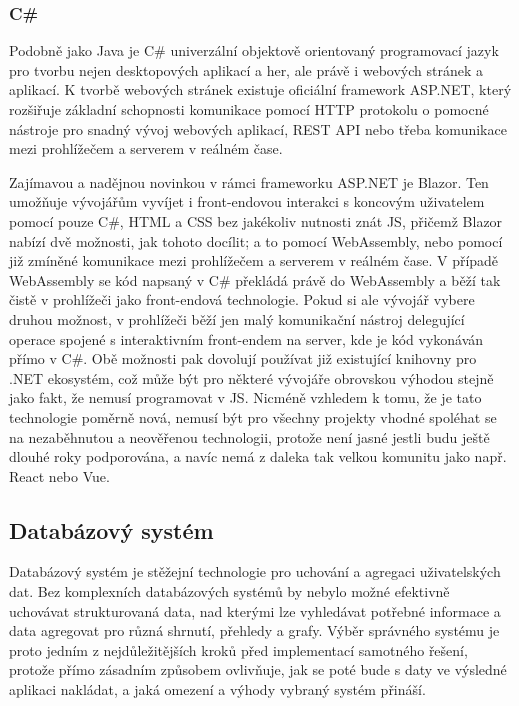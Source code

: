 		\subsubsection{C\#}

		Podobně jako Java je C\# univerzální objektově orientovaný programovací jazyk pro tvorbu nejen
		desktopových aplikací a her, ale právě i webových stránek a aplikací.
		K tvorbě webových stránek existuje oficiální framework ASP.NET, který rozšiřuje základní schopnosti
		komunikace pomocí \Ac{HTTP} protokolu o pomocné nástroje pro snadný vývoj webových aplikací, \Ac{REST} \ac{API} nebo třeba
		komunikace mezi prohlížečem a serverem v reálném čase. \cite{asp_net}

		Zajímavou a nadějnou novinkou v rámci frameworku ASP.NET je Blazor.
		Ten umožňuje vývojářům vyvíjet i front-endovou interakci s koncovým uživatelem pomocí pouze C\#, \Ac{HTML} a \Ac{CSS}
		bez jakékoliv nutnosti znát \ac{JS}, přičemž Blazor nabízí dvě možnosti, jak tohoto docílit; a to pomocí
		WebAssembly, nebo pomocí již zmíněné komunikace mezi prohlížečem a serverem v reálném čase.
		V případě WebAssembly se kód napsaný v C\# překládá právě do WebAssembly a běží tak čistě v prohlížeči
		jako front-endová technologie.
		Pokud si ale vývojář vybere druhou možnost, v prohlížeči běží jen malý komunikační nástroj delegující operace
		spojené s interaktivním front-endem na server, kde je kód vykonáván přímo v C\#.
		Obě možnosti pak dovolují používat již existující knihovny pro .NET ekosystém, což může být pro některé vývojáře
		obrovskou výhodou stejně jako fakt, že nemusí programovat v \ac{JS}.
		Nicméně vzhledem k tomu, že je tato technologie poměrně nová, nemusí být pro všechny projekty vhodné spoléhat
		se na nezaběhnutou a neověřenou technologii, protože není jasné jestli budu ještě dlouhé roky podporována, a
		navíc nemá z daleka tak velkou komunitu jako např. React nebo Vue. \cite{blazor}


	\subsection{Databázový systém}

	Databázový systém je stěžejní technologie pro uchování a agregaci uživatelských dat.
	Bez komplexních databázových systémů by nebylo možné efektivně uchovávat strukturovaná data, nad kterými lze vyhledávat potřebné
	informace a data agregovat pro různá shrnutí, přehledy a grafy.
	Výběr správného systému je proto jedním z nejdůležitějších kroků před implementací samotného řešení, protože přímo
	zásadním způsobem ovlivňuje, jak se poté bude s daty ve výsledné aplikaci nakládat, a jaká omezení a výhody vybraný
	systém přináší.

